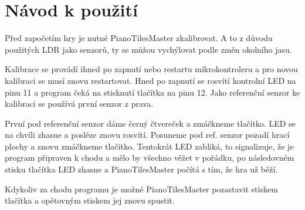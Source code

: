 \documentclass[12pt,oneside]{book} %
\begin{document}
\section{Návod k použití}
\qquad Před započetím hry je nutné PianoTilesMaster zkalibrovat. A to z důvodu použitých LDR jako senzorů, ty se můžou vychýlovat podle změn okolního jasu. \par Kalibrace se provádí ihned po zapnutí nebo restartu mikrokontroleru a pro novou kalibraci se musí znovu restartovat. Hned po zapnutí se rosvítí kontrolní LED na pinu 11 a program čeká na stisknutí tlačítka na pinu 12. Jako referenční senzor ke kalibraci se používá první senzor z prava. \par \qquad První pod referenční senzor dáme černý čtvereček a zmáčkneme tlačítko. LED se na chvíli zhasne a posléze znovu rosvítí. Posuneme pod ref. senzor pozadí hrací plochy a znovu zmáčkneme tlačítko. Tentokrát LED zabliká, to signalizuje, že je program připraven k chodu a mělo by všechno věžet v pořádku, po následovném stisku tlačítka LED zhasne a PianoTilesMaster počítá s tím, že hra už běží. \par \qquad Kdykoliv za chodu programu je možné PianoTilesMaster pozastavit stiskem tlačítka a opětovným stiskem jej znovu spustit.
\end{document}
